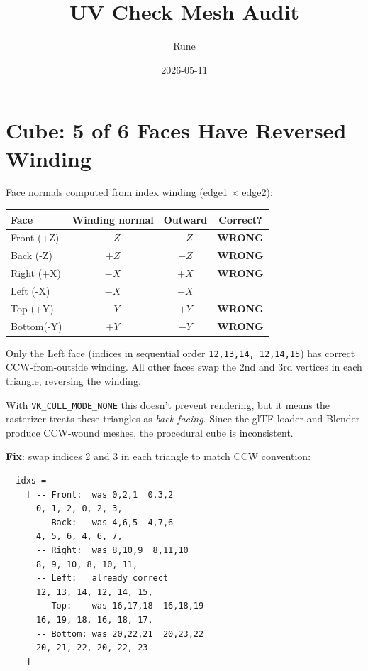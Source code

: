 \documentclass{article}
\title{UV Check Mesh Audit}
\author{Rune}
\date{2026-05-11}
\begin{document}
\maketitle

\section{Cube: 5 of 6 Faces Have Reversed Winding}

Face normals computed from index winding (edge1 $\times$ edge2):

\begin{table}[h]
\centering
\begin{tabular}{lccc}
\toprule
\textbf{Face} & \textbf{Winding normal} & \textbf{Outward} & \textbf{Correct?} \\
\midrule
Front (+Z) & $-Z$ & $+Z$ & \color{red}\textbf{WRONG} \\
Back  (-Z) & $+Z$ & $-Z$ & \color{red}\textbf{WRONG} \\
Right (+X) & $-X$ & $+X$ & \color{red}\textbf{WRONG} \\
Left  (-X) & $-X$ & $-X$ & \color{green}{OK} \\
Top   (+Y) & $-Y$ & $+Y$ & \color{red}\textbf{WRONG} \\
Bottom(-Y) & $+Y$ & $-Y$ & \color{red}\textbf{WRONG} \\
\bottomrule
\end{tabular}
\end{table}

Only the Left face (indices in sequential order \texttt{12,13,14, 12,14,15}) has correct
CCW-from-outside winding. All other faces swap the 2nd and 3rd vertices in each triangle,
reversing the winding.

With \texttt{VK\_CULL\_MODE\_NONE} this doesn't prevent rendering, but it means the
rasterizer treats these triangles as \emph{back-facing}. Since the glTF loader and Blender
produce CCW-wound meshes, the procedural cube is inconsistent.

\textbf{Fix}: swap indices 2 and 3 in each triangle to match CCW convention:

\begin{verbatim}
  idxs =
    [ -- Front:  was 0,2,1  0,3,2
      0, 1, 2, 0, 2, 3,
      -- Back:   was 4,6,5  4,7,6
      4, 5, 6, 4, 6, 7,
      -- Right:  was 8,10,9  8,11,10
      8, 9, 10, 8, 10, 11,
      -- Left:   already correct
      12, 13, 14, 12, 14, 15,
      -- Top:    was 16,17,18  16,18,19
      16, 19, 18, 16, 18, 17,
      -- Bottom: was 20,22,21  20,23,22
      20, 21, 22, 20, 22, 23
    ]
\end{verbatim}
\end{document}
